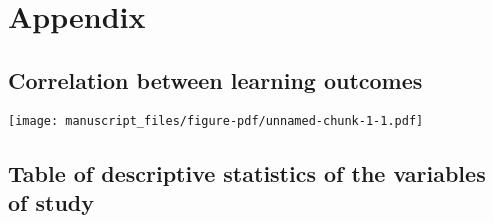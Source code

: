 \documentclass[
]{article}
\begin{document}
\newpage

\section{Appendix}\label{appendix}

\subsection{Correlation between learning outcomes}\label{sec-app1}

\texttt{[image: manuscript\_files/figure-pdf/unnamed-chunk-1-1.pdf]}

\subsection{Table of descriptive statistics of the variables of
study}\label{sec-app2}
\end{document}
